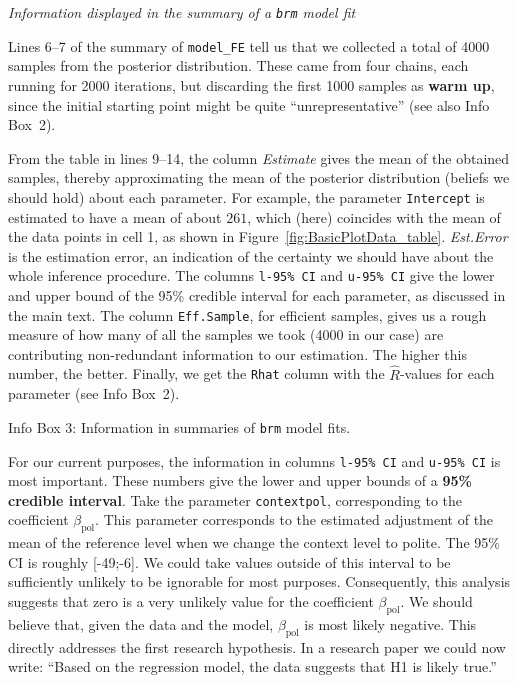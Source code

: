 \documentclass[nobib]{tufte-handout}
\begin{document}
\begin{InfoBox}[t]
\centering
\colorbox{mygray}{\centering
  \begin{minipage}{1.0\textwidth}

    \emph{Information displayed in the summary of a \texttt{brm} model fit}
    \medskip

    Lines 6--7 of the summary of \texttt{model\_FE} tell us that we collected a total of 4000 samples from the posterior distribution. These came from four chains, each running for 2000 iterations, but discarding the first 1000 samples as \textbf{warm up}, since the initial starting point might be quite ``unrepresentative'' (see also Info Box~2).
    
    From the table in lines 9--14, the column \emph{Estimate} gives the mean of the obtained
    samples, thereby approximating the mean of the posterior distribution (beliefs we should
    hold) about each parameter. For example, the parameter \texttt{Intercept} is estimated to
    have a mean of about $261$, which (here) coincides with the mean of the data points in cell
    1, as shown in Figure~\ref{fig:BasicPlotData_table}. \emph{Est.Error} is the estimation
    error, an indication of the certainty we should have about the whole inference procedure.
    The columns \texttt{l-95\% CI} and \texttt{u-95\% CI} give the lower and upper bound of the
    95\% credible interval for each parameter, as discussed in the main text. The column
    \texttt{Eff.Sample}, for efficient samples, gives us a rough measure of how many of all the
    samples we took (4000 in our case) are contributing non-redundant information to our
    estimation. The higher this number, the better. Finally, we get the \texttt{Rhat} column with the $\hat{R}$-values for each parameter (see Info Box~2).
    
  \end{minipage} \par
  } \par
  \begin{center}
    Info Box 3: Information in summaries of \texttt{brm} model fits.
  \end{center}
\end{InfoBox}


For our current purposes, the information in  columns \texttt{l-95\% CI} and \texttt{u-95\% CI} is most important.
These numbers give the lower and upper bounds of a \textbf{95\% credible interval}.
Take the parameter \texttt{contextpol}, corresponding to the coefficient $\beta_{\text{pol}}$.
This parameter corresponds to the estimated adjustment of the mean of the reference level when we change the context level to polite.
The 95\% CI is roughly [-49;-6].
We could take values outside of this interval to be sufficiently unlikely to be ignorable for most purposes.
Consequently, this analysis suggests that zero is a very unlikely value for the coefficient
$\beta_{\text{pol}}$.
We should believe that, given the data and the model, $\beta_{\text{pol}}$ is most likely negative.
This directly addresses the first research hypothesis.
In a research paper we could now write: ``Based on the regression model, the data suggests that H1 is likely true.''
\end{document}

